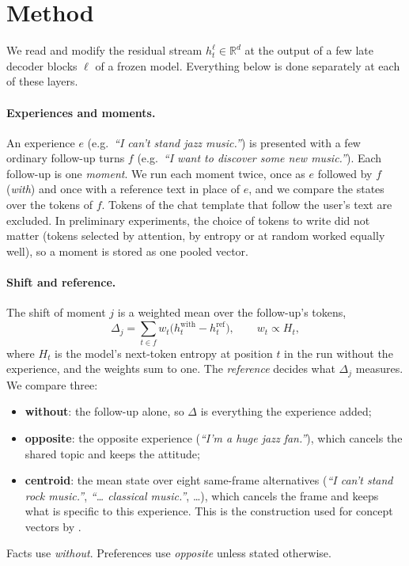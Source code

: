 \documentclass[11pt]{article}
\begin{document}
\section{Method}
\label{sec:method}

We read and modify the residual stream $h^{\ell}_t \in \mathbb{R}^d$ at the output of a few late decoder blocks $\ell$ of a frozen model. Everything below is done separately at each of these layers.

\paragraph{Experiences and moments.} An experience $e$ (e.g.\ \textit{``I can't stand jazz music.''}) is presented with a few ordinary follow-up turns $f$ (e.g.\ \textit{``I want to discover some new music.''}). Each follow-up is one \emph{moment}. We run each moment twice, once as $e$ followed by $f$ (\emph{with}) and once with a reference text in place of $e$, and we compare the states over the tokens of $f$. Tokens of the chat template that follow the user's text are excluded. In preliminary experiments, the choice of tokens to write did not matter (tokens selected by attention, by entropy or at random worked equally well), so a moment is stored as one pooled vector.

\paragraph{Shift and reference.} The shift of moment $j$ is a weighted mean over the follow-up's tokens,
\begin{equation}
  \Delta_j = \sum_{t \in f} w_t \bigl(h^{\text{with}}_t - h^{\text{ref}}_t\bigr), \qquad w_t \propto H_t,
\end{equation}
where $H_t$ is the model's next-token entropy at position $t$ in the run without the experience, and the weights sum to one. The \emph{reference} decides what $\Delta_j$ measures. We compare three:
\begin{itemize}
  \item \textbf{without}: the follow-up alone, so $\Delta$ is everything the experience added;
  \item \textbf{opposite}: the opposite experience (\textit{``I'm a huge jazz fan.''}), which cancels the shared topic and keeps the attitude;
  \item \textbf{centroid}: the mean state over eight same-frame alternatives (\textit{``I can't stand rock music.''}, \textit{``\ldots{} classical music.''}, \ldots), which cancels the frame and keeps what is specific to this experience. This is the construction used for concept vectors by \citet{lindsey2026introspection}.
\end{itemize}
Facts use \textit{without}. Preferences use \textit{opposite} unless stated otherwise.
\end{document}
